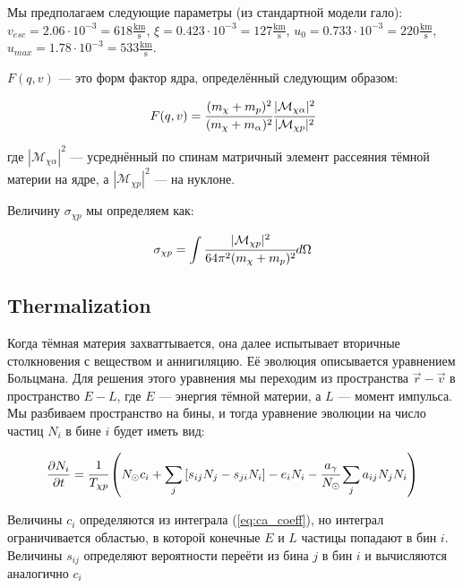 \documentclass[a4paper, 14pt]{article}
\newcommand{\deriv}[2]{\frac{\partial #1}{\partial #2}}
\begin{document}
Мы предполагаем следующие параметры (из стандартной модели гало):
$v_{esc} = 2.06 \cdot 10^{-3} = 618 \frac{\text{km}}{\text{s}}$, $\xi = 0.423 \cdot 10^{-3} = 127 \frac{\text{km}}{\text{s}}$, $u_0 = 0.733 \cdot 10^{-3} = 220 \frac{\text{km}}{\text{s}}$, $u_{max} = 1.78 \cdot 10^{-3} = 533 \frac{\text{km}}{\text{s}}$.

$F(q,v)$ --- это форм фактор ядра, определённый следующим образом:

\begin{equation}
	\label{eq::ff_def}
	F(q,v) = \cfrac{(m_{\chi} + m_{p})^2}{(m_{\chi} + m_{\alpha})^2}
	\cfrac{|\mathcal{M}_{\chi \alpha}|^2}
	{|\mathcal{M}_{\chi p}|^2}
\end{equation}

где $|\mathcal{M}_{\chi \alpha}|^2$ --- усреднённый по спинам матричный элемент рассеяния тёмной материи на ядре, а $|\mathcal{M}_{\chi p}|^2$ --- на нуклоне.

Величину $\sigma_{\chi p}$ мы определяем как:

\begin{equation}
	\label{eq:sigma_def}
	\sigma_{\chi p} = \int {\cfrac{|\mathcal{M}_{\chi p}|^2}{64\pi^2 (m_{\chi} + m_p)^2} d\Omega}
\end{equation}




	\subsection{Thermalization}
	Когда тёмная материя захваттывается, она далее испытывает вторичные столкновения с веществом и аннигиляцию. Её эволюция описывается уравнением Больцмана. Для решения этого уравнения мы переходим из пространства $\vec{r}-\vec{v}$ в пространство $E-L$, где $E$ --- энергия тёмной материи, а $L$ --- момент импульса. Мы разбиваем пространство на бины, и тогда уравнение эволюции на число частиц $N_{i}$ в бине $i$ будет иметь вид:

\begin{equation}
	\label{eq:evolution}
	\deriv{N_{i}}{t} = \cfrac{1}{T_{\chi p}} \left(N_{\odot} c_i +
	\sum_j{[s_{ij} N_{j} - s_{ji} N_{i} ]} - e_{i} N_i - \cfrac{a_{\gamma}}{N_{\odot}} \sum_j {a_{ij} N_j N_i} \right)
\end{equation}

Величины $c_i$ определяются из интеграла (\ref{eq:ca_coeff}), но интеграл ограничивается областью, в которой конечные $E$ и $L$ частицы попадают в бин $i$.
Величины $s_{ij}$ определяют вероятности переёти из бина $j$ в бин $i$ и вычисляются аналогично $c_{i}$
\end{document}
